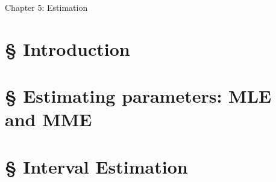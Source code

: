 \documentclass[compress,trans,9pt]{beamer}
\begin{document}


\begin{frame}[noframenumbering]
  \titlepage
\end{frame}




\begin{frame}
\begin{center}
\huge
 Chapter 5: Estimation
\end{center}
\end{frame}

\section{\S{} Introduction}

\section{\S{} Estimating parameters: MLE and MME}

\section{\S{} Interval Estimation}
% 
% 
% 
% 
% 
% 
\end{document}
